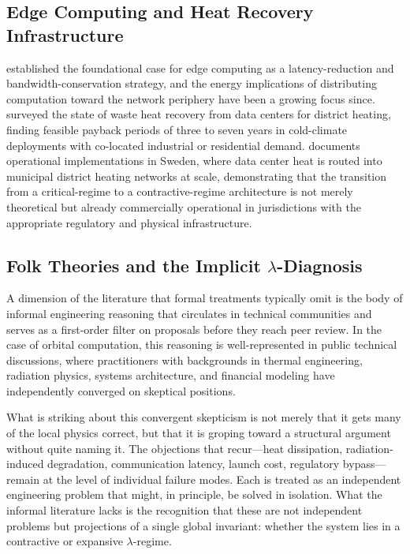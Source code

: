 \documentclass[11pt,a4paper]{article}
\theoremstyle{plain}
\theoremstyle{definition}
\theoremstyle{remark}
\begin{document}
\subsection{Edge Computing and Heat Recovery Infrastructure}

\citet{satyanarayanan2017} established the foundational case for edge computing
as a latency-reduction and bandwidth-conservation strategy, and the energy
implications of distributing computation toward the network periphery have been
a growing focus since. \citet{rambo2014} surveyed the state of waste heat
recovery from data centers for district heating, finding feasible payback
periods of three to seven years in cold-climate deployments with co-located
industrial or residential demand. \citet{stockholm2020} documents operational
implementations in Sweden, where data center heat is routed into municipal
district heating networks at scale, demonstrating that the transition from a
critical-regime to a contractive-regime architecture is not merely theoretical
but already commercially operational in jurisdictions with the appropriate
regulatory and physical infrastructure.

\subsection{Folk Theories and the Implicit $\lambda$-Diagnosis}

A dimension of the literature that formal treatments typically omit is the body
of informal engineering reasoning that circulates in technical communities and
serves as a first-order filter on proposals before they reach peer review. In
the case of orbital computation, this reasoning is well-represented in public
technical discussions, where practitioners with backgrounds in thermal
engineering, radiation physics, systems architecture, and financial modeling
have independently converged on skeptical positions.

What is striking about this convergent skepticism is not merely that it gets
many of the local physics correct, but that it is groping toward a structural
argument without quite naming it. The objections that recur---heat dissipation,
radiation-induced degradation, communication latency, launch cost, regulatory
bypass---remain at the level of individual failure modes. Each is treated as an
independent engineering problem that might, in principle, be solved in isolation.
What the informal literature lacks is the recognition that these are not
independent problems but projections of a single global invariant: whether the
system lies in a contractive or expansive $\lambda$-regime.
\end{document}
